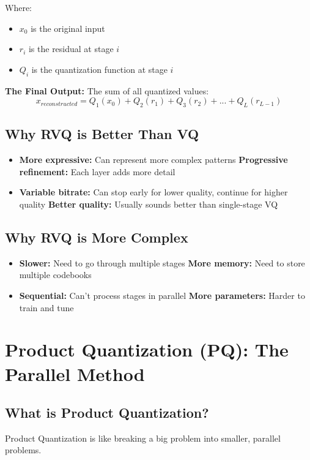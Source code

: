 \documentclass[12pt]{article}
\begin{document}
Where:
\begin{itemize}
    \item $x_0$ is the original input
    \item $r_i$ is the residual at stage $i$
    \item $Q_i$ is the quantization function at stage $i$
\end{itemize}

\textbf{The Final Output:} The sum of all quantized values:
$$x_{reconstructed} = Q_1(x_0) + Q_2(r_1) + Q_3(r_2) + ... + Q_L(r_{L-1})$$

\subsection{Why RVQ is Better Than VQ}

\begin{itemize}
    \item \textbf{More expressive:} Can represent more complex patterns
    \textbf{Progressive refinement:} Each layer adds more detail
    \item \textbf{Variable bitrate:} Can stop early for lower quality, continue for higher quality
    \textbf{Better quality:} Usually sounds better than single-stage VQ
\end{itemize}

\subsection{Why RVQ is More Complex}

\begin{itemize}
    \item \textbf{Slower:} Need to go through multiple stages
    \textbf{More memory:} Need to store multiple codebooks
    \item \textbf{Sequential:} Can't process stages in parallel
    \textbf{More parameters:} Harder to train and tune
\end{itemize}

\section{Product Quantization (PQ): The Parallel Method}

\subsection{What is Product Quantization?}

Product Quantization is like breaking a big problem into smaller, parallel problems.
\end{document}
